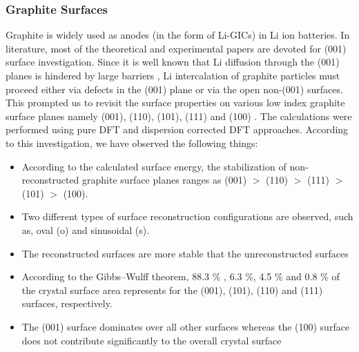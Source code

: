 \documentclass[journal=jacsat,manuscript=article]{achemso}
\begin{document}
\subsubsection{Graphite Surfaces}
Graphite is widely used as anodes (in the form of Li-GICs) in Li ion batteries. In literature, most of the theoretical and experimental papers are devoted for (001) surface investigation. Since it is well known that Li diffusion through the (001) planes is hindered by large barriers \cite{RanaLiC6}, Li intercalation of graphite particles must proceed either via defects in the (001) plane or via the open non-(001) surfaces. This prompted us to revisit the surface properties on various low index graphite surface planes namely (001), (110), (101), (111) and (100) \cite{Rana-Graphite-Surf}. The calculations were performed using pure DFT and dispersion corrected DFT approaches. According to this investigation, we have observed the following things:
\begin{itemize}
    \item According to the calculated surface energy, the stabilization of non-reconstructed graphite surface planes ranges as (001) $>$ (110) $>$ (111) $>$ (101) $>$ (100).
    \item Two different types of surface reconstruction configurations are observed, such as, oval (o) and sinusoidal (s).
    \item The reconstructed surfaces are more stable that the unreconstructed surfaces 
    \item According to the Gibbs–Wulff theorem, 88.3 \% , 6.3 \%, 4.5 \% and 0.8 \% of the crystal surface area represents for the (001), (101), (110) and (111) surfaces, respectively.  
    \item The (001) surface dominates over all other surfaces whereas the (100) surface does not contribute significantly to the overall crystal surface
\end{itemize}
\end{document}
